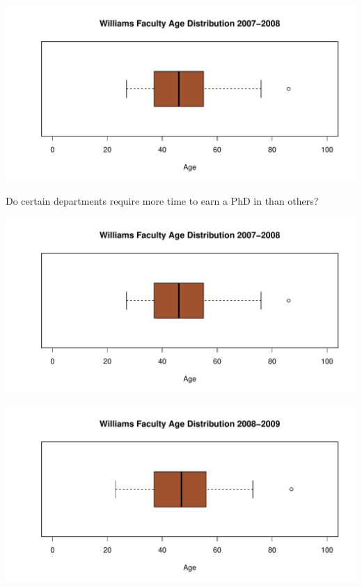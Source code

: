 \documentclass[12pt,a4paper]{article}\usepackage[]{graphicx}\usepackage[]{color}
\makeatletter
\def\maxwidth{ %
  \ifdim\Gin@nat@width>\linewidth
    \linewidth
  \else
    \Gin@nat@width
  \fi
}
\newenvironment{knitrout}{}{} %
\theoremstyle{definition}
\makeatother
\begin{document}
\begin{knitrout}
\color{fgcolor}
\includegraphics[width=\maxwidth]{figure/unnamed-chunk-20-1} 

\end{knitrout}



Do certain departments require more time to earn a PhD in than others?

\begin{knitrout}
\color{fgcolor}
\includegraphics[width=\maxwidth]{figure/unnamed-chunk-21-1} 

\end{knitrout}

\begin{knitrout}
\color{fgcolor}
\includegraphics[width=\maxwidth]{figure/unnamed-chunk-22-1} 

\end{knitrout}
\end{document}
